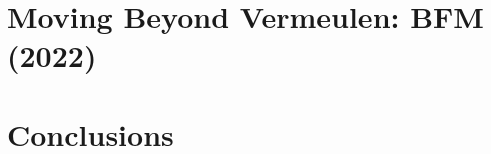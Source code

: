 \documentclass[12pt]{article}
\begin{document}
\newpage
\section{Moving Beyond Vermeulen: BFM (2022)}\label{sec:bfm-methodology}


\newpage
\section{Conclusions}\label{sec:conclusions}



\newpage



\newpage
\appendix

\end{document}
